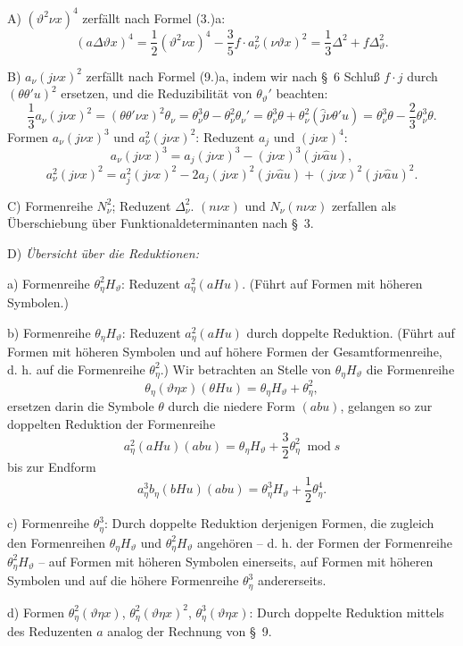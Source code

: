 \documentclass[11pt]{article}
\newcommand{\A}{\Delta}
\newcommand{\modu}[1]{\;\operatorname{mod} #1}
\providecommand{\modu}[1]{\;\operatorname{mod} #1}
\begin{document}
\noindent A) $(\vartheta^2\nu x)^4$ zerfällt nach Formel (3.)a:
\[
(a\A\vartheta x)^4=\frac12(\vartheta^2\nu x)^4-\frac35 f\cdot a_\nu^2(\nu\vartheta x)^2
=\frac13\A^2+f\A_\vartheta^2.
\]

\noindent B) $a_\nu(j\nu x)^2$ zerfällt nach Formel (9.)a, indem wir nach \S\ 6 Schluß $f\cdot j$ durch $(\theta\theta'u)^2$ ersetzen, und die Reduzibilität von $\theta_\vartheta'$ beachten:
\[
\frac13a_\nu(j\nu x)^2=(\theta\theta'\nu x)^2\theta_\nu
=\theta_\nu^3\theta-\theta_\nu^2\theta_\nu'
=\theta_\nu^3\theta+\theta_\nu^2(\widehat{j}\nu\theta'u)
=\theta_\nu^3\theta-\frac23\theta_\nu^3\theta.
\]
Formen $a_\nu(j\nu x)^3$ und $a_\nu^2(j\nu x)^2$: Reduzent $a_j$ und $(j\nu x)^4$:
\[
a_\nu(j\nu x)^3=a_j(j\nu x)^3-(j\nu x)^3(j\nu\widehat{a}u),
\]
\[
a_\nu^2(j\nu x)^2=a_j^2(j\nu x)^2-2a_j(j\nu x)^2(j\nu\widehat{a}u)+(j\nu x)^2(j\nu\widehat{a}u)^2.
\]

\noindent C) Formenreihe $N_\nu^2$; Reduzent $\A_\nu^2$. $(n\nu x)$ und $N_\nu(n\nu x)$ zerfallen als Überschiebung über Funktionaldeterminanten nach \S\ 3.

\noindent D) \emph{Übersicht über die Reduktionen:}

a) Formenreihe $\theta_\eta^2H_\vartheta$: Reduzent $a_\eta^2(aHu)$. (Führt auf Formen mit höheren Symbolen.)

b) Formenreihe $\theta_\eta H_\vartheta$: Reduzent $a_\eta^2(aHu)$ durch doppelte Reduktion. (Führt auf Formen mit höheren Symbolen und auf höhere Formen der Gesamtformenreihe, d. h. auf die Formenreihe $\theta_\eta^2$.) Wir betrachten an Stelle von $\theta_\eta H_\vartheta$ die Formenreihe
\[
\theta_\eta(\vartheta\eta x)(\theta Hu)=\theta_\eta H_\vartheta+\theta_\eta^2,
\]
ersetzen darin die Symbole $\theta$ durch die niedere Form $(abu)$, gelangen so zur doppelten Reduktion der Formenreihe
\[
a_\eta^2(aHu)(abu)=\theta_\eta H_\vartheta+\frac32\theta_\eta^2\modu{s}
\]
bis zur Endform
\[
a_\eta^3b_\eta(bHu)(abu)=\theta_\eta^3H_\vartheta+\frac12\theta_\eta^4.
\]

c) Formenreihe $\theta_\eta^3$: Durch doppelte Reduktion derjenigen Formen, die zugleich den Formenreihen $\theta_\eta H_\vartheta$ und $\theta_\eta^2H_\vartheta$ angehören -- d. h. der Formen der Formenreihe $\theta_\eta^2H_\vartheta$ -- auf Formen mit höheren Symbolen einerseits, auf Formen mit höheren Symbolen und auf die höhere Formenreihe $\theta_\eta^3$ andererseits.

d) Formen $\theta_\eta^2(\vartheta\eta x)$, $\theta_\eta^2(\vartheta\eta x)^2$, $\theta_\eta^3(\vartheta\eta x)$: Durch doppelte Reduktion mittels des Reduzenten $a$ analog der Rechnung von \S\ 9.
\end{document}
